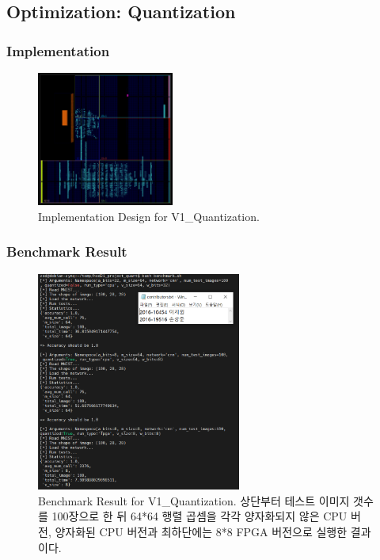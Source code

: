 \documentclass{article}
\begin{document}
\subsection{Optimization: Quantization}

\subsubsection{Implementation}
\begin{figure}[htb!]
	\centering
	\includegraphics[width=0.4\textwidth]{fig/V1_Quantization/impl.png}
\caption{Implementation Design for V1\_Quantization.}
\label{impl_v1_quantization}
\end{figure}
\subsubsection{Benchmark Result}
\begin{figure}[htb!]
	\centering
	\includegraphics[width=0.60\textwidth]{fig/V1_Quantization/benchmark.png}
\caption{Benchmark Result for V1\_Quantization. 상단부터 테스트 이미지 갯수를 100장으로 한 뒤 64*64 행렬 곱셈을 각각 양자화되지 않은 CPU 버전, 양자화된 CPU 버전과 최하단에는 8*8 FPGA 버전으로 실행한 결과이다. }
\label{benchmark_v1_quantization}
\end{figure}
\end{document}
